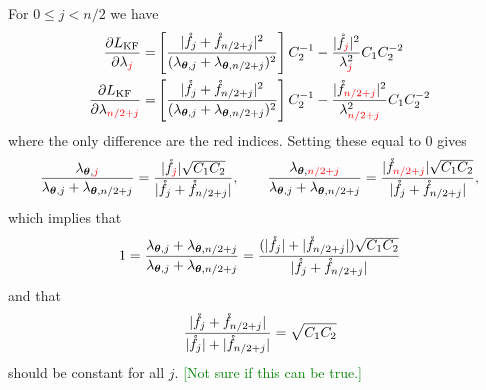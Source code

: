 \documentclass{amsart}
\begin{document}
For $0 \leq j < n/2$ we have 
\begin{align*}
    \frac{\partial L_\mathrm{KF}}{\partial \lambda_{\textcolor{red}{j}}} 
    =& \left[\frac{\lvert \mathring{f}_j + \mathring{f}_{n/2+j} \rvert^2}{(\lambda_{\boldsymbol{\theta},j} + \lambda_{\boldsymbol{\theta},n/2+j})^2}\right] C_2^{-1} - \frac{\lvert \mathring{f}_{\textcolor{red}{j}} \rvert^2}{\lambda_{\textcolor{red}{j}}^2} C_1 C_2^{-2} \\
    \frac{\partial L_\mathrm{KF}}{\partial \lambda_{\textcolor{red}{n/2+j}}}
    =& \left[\frac{\lvert \mathring{f}_j + \mathring{f}_{n/2+j} \rvert^2}{(\lambda_{\boldsymbol{\theta},j} + \lambda_{\boldsymbol{\theta},n/2+j})^2}\right]  C_2^{-1}  - \frac{\lvert \mathring{f}_{\textcolor{red}{n/2+j}} \rvert^2}{\lambda_{\textcolor{red}{n/2+j}}^2} C_1 C_2^{-2}
\end{align*}
where the only difference are the red indices.
Setting these equal to $0$ gives 
\begin{equation} \label{eq:KFoptcond}
\frac{\lambda_{\boldsymbol{\theta},{\textcolor{red}{j}}}}{\lambda_{\boldsymbol{\theta},j} + \lambda_{\boldsymbol{\theta},n/2+j}} = \frac{\lvert \mathring{f}_{\textcolor{red}{j}} \rvert \sqrt{C_1C_2}}{\lvert \mathring{f}_j + \mathring{f}_{n/2+j} \rvert}, \qquad 
\frac{\lambda_{\boldsymbol{\theta},{\textcolor{red}{n/2+j}}}}{\lambda_{\boldsymbol{\theta},j} + \lambda_{\boldsymbol{\theta},n/2+j}} = \frac{\lvert \mathring{f}_{\textcolor{red}{n/2+j}} \rvert \sqrt{C_1C_2}}{\lvert \mathring{f}_j + \mathring{f}_{n/2+j} \rvert},
\end{equation}
which implies that 
\[
1 = \frac{\lambda_{\boldsymbol{\theta},{j}} +  \lambda_{\boldsymbol{\theta},{n/2+j}}} {\lambda_{\boldsymbol{\theta},j} + \lambda_{\boldsymbol{\theta},n/2+j}} = 
\frac{(\lvert \mathring{f}_{j} \rvert + \lvert \mathring{f}_{n/2+j} \rvert) \sqrt{C_1C_2}}{\lvert \mathring{f}_j + \mathring{f}_{n/2+j} \rvert}
\]
and that 
\[
\frac{\lvert \mathring{f}_j + \mathring{f}_{n/2+j} \rvert} {\lvert \mathring{f}_{j} \rvert + \lvert \mathring{f}_{n/2+j} \rvert} = \sqrt{C_1C_2}
\]
should be constant for all $j$.  \textcolor{green}{[Not sure if this can be true.]}
\end{document}
